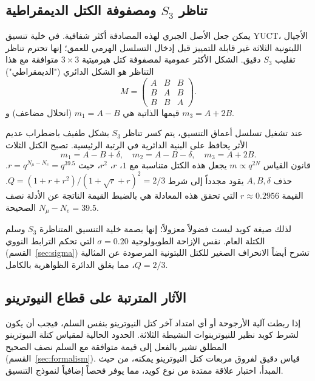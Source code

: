 \documentclass[11pt,a4paper]{article}
\begin{document}
	\subsection{تناظر \(S_3\) ومصفوفة الكتل الديمقراطية}
	
	يمكن جعل الأصل الجبري لهذه المصادفة أكثر شفافية. في خلية تنسيق YUCT، الأجيال اللبتونية الثلاثة غير قابلة للتمييز قبل إدخال التسلسل الهرمي للعمق؛ إنها تحترم تناظر تقليب \(S_3\) دقيق. الشكل الأكثر عمومية لمصفوفة كتل هيرميتية \(3\times3\) متوافقة مع هذا التناظر هو الشكل الدائري ("الديمقراطي")
	\begin{equation}
		M = \begin{pmatrix}
			A & B & B \\
			B & A & B \\
			B & B & A
		\end{pmatrix}.
		\label{eq:democratic}
	\end{equation}
	قيمها الذاتية هي \(m_1 = A - B\) (انحلال مضاعف) و \(m_3 = A + 2B\).
	
	عند تشغيل تسلسل أعماق التنسيق، يتم كسر تناظر \(S_3\) بشكل طفيف باضطراب عديم الأثر يحافظ على البنية الدائرية في الرتبة الرئيسية. تصبح الكتل الثلاث
	\begin{equation}
		m_1 = A - B + \delta,\quad
		m_2 = A - B - \delta,\quad
		m_3 = A + 2B.
	\end{equation}
	قانون القياس \(m \propto q^{2N}\) يجعل هذه الكتل متناسبة مع \(1\)، \(r\)، \(r^2\)، حيث \(r = q^{N_\mu - N_e} = q^{39.5}\). حذف \(A,B,\delta\) يقود مجدداً إلى شرط \(Q = (1+r+r^2)/(1+\sqrt{r}+r)^2 = 2/3\). القيمة \(r \approx 0.2956\) التي تحقق هذه المعادلة هي بالضبط القيمة الناتجة عن الأدلة نصف الصحيحة \(N_\mu - N_e = 39.5\).
	
	لذلك صيغة كويد ليست فضولاً معزولاً؛ إنها بصمة خلية التنسيق المتناظرة \(S_3\) وسلم الكتلة العام. نفس الإزاحة الطوبولوجية \(\sigma = 0.20\) التي تحكم الترابط النووي (القسم~\ref{sec:sigma}) تشرح أيضاً الانحراف الصغير للكتل اللبتونية المرصودة عن المثالية \(Q = 2/3\)، مما يغلق الدائرة الظواهرية بالكامل.
	
	\subsection{الآثار المترتبة على قطاع النيوترينو}
	
	إذا ربطت آلية الأرجوحة أو أي امتداد آخر كتل النيوترينو بنفس السلم، فيجب أن يكون لشرط كويد نظير للنيوترينوات النشيطة الثلاثة. الحدود الحالية لمقياس كتلة النيوترينو المطلق تشير بالفعل إلى قيمة متوافقة مع السلم نصف الصحيح (القسم~\ref{sec:formalism}). قياس دقيق لفروق مربعات كتل النيوترينو يمكنه، من حيث المبدأ، اختبار علاقة ممتدة من نوع كويد، مما يوفر فحصاً إضافياً لنموذج التنسيق.
	
\end{document}
